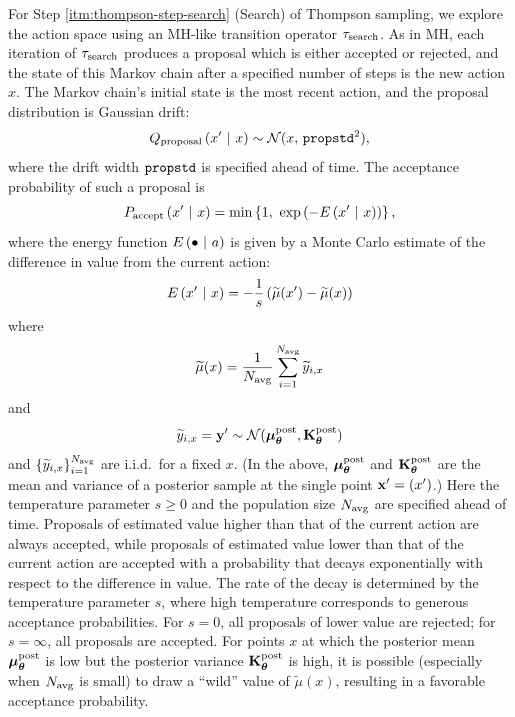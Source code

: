 For Step \ref{itm:thompson-step-search} (Search) of Thompson sampling, we
explore the action space using an MH-like transition operator $\tau_{\textrm{search}}$.
As in MH, each iteration of $\tau_{\textrm{search}}$ produces a proposal which is either
accepted or rejected, and the state of this Markov chain after a specified
number of steps is the new action $x$.  The Markov chain's initial state is the
most recent action, and the proposal distribution is Gaussian drift:
\[ Q_{\textrm{proposal}}\left( x' \ \middle\vert\  x \right) \sim \mathcal{N}(x,\,\texttt{propstd}^2), \]
where the drift width $\texttt{propstd}$ is specified ahead of time.  The acceptance
probability of such a proposal is
\[ P_\accept\pn{x' \mvert x} = \min\br{1,\ \exp\pn{-E\pn{x' \mvert x}}}, \]
where the energy function $E\left( \bullet \ \middle\vert\  a \right)$ is given by a Monte Carlo
estimate of the difference in value from the current action:
\[ E\left( x' \ \middle\vert\  x \right) = -\frac1s \left( \widetilde{\mu}(x') - \widetilde{\mu}(x) \right) \]
where
\[ \widetilde{\mu}(x) = \frac{1}{N_{\textrm{avg}}} \sum_{i=1}^{N_{\textrm{avg}}} \widetilde{y}_{i,x} \]
and
\[ \widetilde{y}_{i,x}=\mathbf{y}^\prime \sim \mathcal{N}(\bm{\mu}_{\bm{\theta}}^\text{post}, \mathbf{K}_{\bm{\theta}}^\text{post}) \]
and $\left\{ \widetilde{y}_{i,x} \right\}_{i=1}^{N_{\textrm{avg}}}$ are i.i.d.\ for a fixed $x$.
(In the above, $\bm{\mu}_{\bm{\theta}}^\text{post}$ and $\mathbf{K}_{\bm{\theta}}^\text{post}$ are the mean and variance of a posterior
sample at the single point $\mathbf{x}^\prime = (x^\prime)$.)
Here the temperature parameter $s \geq 0$ and the population size $N_{\textrm{avg}}$ are
specified ahead of time.  Proposals of estimated value higher than that of the current action are
always accepted, while proposals of estimated value lower than that of the
current action are accepted with a probability that decays exponentially
with respect to the difference in value.
The rate of the decay is determined by the temperature parameter $s$,
where high temperature corresponds to generous acceptance probabilities.
For $s=0$, all proposals of lower value are rejected; for $s=\infty$, all
proposals are accepted.
For points $x$ at which the posterior mean $\bm{\mu}_{\bm{\theta}}^\text{post}$ is low but the
posterior variance $\mathbf{K}_{\bm{\theta}}^\text{post}$ is high, it is possible (especially when
$N_{\textrm{avg}}$ is small) to draw a ``wild'' value of $\widetilde{\mu}(x)$, resulting in a
favorable acceptance probability.



